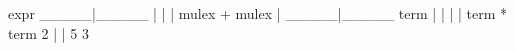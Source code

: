       expr
  _____|_____
  |    |    |
mulex  +  mulex
  |    _____|_____
 term  |    |    |
  |   term  *   term
  2    |         |
       5         3

